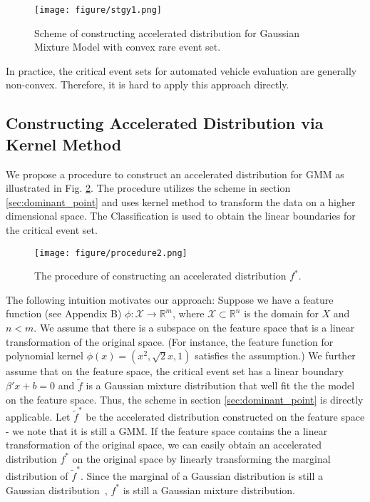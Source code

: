 \documentclass[letterpaper, 10 pt, journal]{IEEEtran}  %
\newcommand{\mansur}[1]{\textcolor{blue}{[Mansur: #1]}}
\begin{document}
\begin{figure}[t]
	\centering
	\texttt{[image: figure/stgy1.png]}
	\caption{Scheme of constructing accelerated distribution for Gaussian Mixture Model with convex rare event set.}
	\label{fig:stgy1}
\end{figure}

In practice, the critical event sets for automated vehicle evaluation are generally non-convex. Therefore, it is hard to apply this approach directly. 


\subsection{Constructing Accelerated Distribution via Kernel Method}\label{sec:construction}

We propose a procedure to construct an accelerated distribution for GMM as illustrated in Fig. \ref{fig:procedure2}. The procedure utilizes the scheme in section \ref{sec:dominant_point} and uses kernel method to transform the data on a higher dimensional space. The Classification is used to obtain the linear boundaries for the critical event set.

\begin{figure}[t]
	\centering
	\texttt{[image: figure/procedure2.png]}
	\caption{The procedure of constructing an accelerated distribution $f^*$.}
	\label{fig:procedure2}
\end{figure}

The following intuition motivates our approach: Suppose we have a feature function (see Appendix B) $\phi:\mathcal{X} \rightarrow \mathbb{R}^m$, where $\mathcal{X} \subset \mathbb{R}^n$ is the domain for $X$ and $n<m$. We assume that there is a subspace on the feature space that is a linear transformation of the original space. (For instance, the feature function for polynomial kernel $\phi(x)=(x^2,\sqrt{2}x,1)$ satisfies the assumption.) We further assume that on the feature space, the critical event set has a linear boundary $\beta'x+b=0$ and $\tilde{f}$ is a Gaussian mixture distribution that well fit the the model on the feature space. Thus, the scheme in section \ref{sec:dominant_point} is directly applicable. Let $\tilde{f}^*$ be the accelerated distribution constructed on the feature space - we note that it is still a GMM. If the feature space contains the a linear transformation of the original space, we can easily obtain an accelerated distribution $f^*$ on the original space by linearly transforming the marginal distribution of $\tilde{f}^*$. Since the marginal of a Gaussian distribution is still a Gaussian distribution~\cite{papoulis2002probability}, $f^*$ is still a Gaussian mixture distribution.
\end{document}
